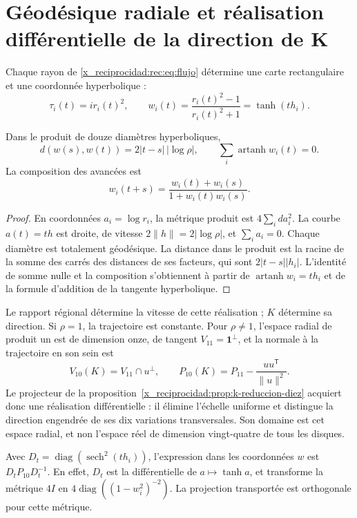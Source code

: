 \section{Géodésique radiale et réalisation différentielle de la direction de K}

Chaque rayon de \eqref{x_reciprocidad:rec:eq:flujo} détermine une carte rectangulaire et une coordonnée hyperbolique :
\[
 \tau_i(t)=ir_i(t)^2,\qquad
 w_i(t)=\frac{r_i(t)^2-1}{r_i(t)^2+1}=\tanh(th_i).
\]

\begin{theorem}
\label{x_reciprocidad:rec:thm:geodesica}
Dans le produit de douze diamètres hyperboliques,
\begin{equation}
 d(w(s),w(t))=2|t-s|\,|\log\rho|,\qquad
 \sum_i\operatorname{artanh}w_i(t)=0.
 \label{x_reciprocidad:rec:eq:geodesica}
\end{equation}
La composition des avancées est
\[
 w_i(t+s)=\frac{w_i(t)+w_i(s)}{1+w_i(t)w_i(s)}.
\]
\end{theorem}
\begin{proof}
En coordonnées \(a_i=\log r_i\), la métrique produit est \(4\sum_i da_i^2\). La courbe \(a(t)=th\) est droite, de vitesse \(2\|h\|=2|\log\rho|\), et \(\sum_i a_i=0\). Chaque diamètre est totalement géodésique. La distance dans le produit est la racine de la somme des carrés des distances de ses facteurs, qui sont \(2|t-s||h_i|\). L'identité de somme nulle et la composition s'obtiennent à partir de \(\operatorname{artanh}w_i=th_i\) et de la formule d'addition de la tangente hyperbolique.
\end{proof}

Le rapport régional détermine la vitesse de cette réalisation ; \(K\) détermine sa direction. Si \(\rho=1\), la trajectoire est constante. Pour \(\rho\ne1\), l’espace radial de produit un est de dimension onze, de tangent \(V_{11}=\mathbf1^\perp\), et la normale à la trajectoire en son sein est
\[
 V_{10}(K)=V_{11}\cap u^\perp,\qquad
 P_{10}(K)=P_{11}-\frac{uu^{\mathsf T}}{\|u\|^2}.
\]
Le projecteur de la proposition~\ref{x_reciprocidad:prop:k-reduccion-diez} acquiert donc une réalisation différentielle : il élimine l’échelle uniforme et distingue la direction engendrée de ses dix variations transversales. Son domaine est cet espace radial, et non l’espace réel de dimension vingt-quatre de tous les disques.

Avec \(D_t=\operatorname{diag}(\operatorname{sech}^2(th_i))\), l’expression dans les coordonnées \(w\) est \(D_tP_{10}D_t^{-1}\). En effet, \(D_t\) est la différentielle de \(a\mapsto\tanh a\), et transforme la métrique \(4I\) en \(4\operatorname{diag}((1-w_i^2)^{-2})\). La projection transportée est orthogonale pour cette métrique.

